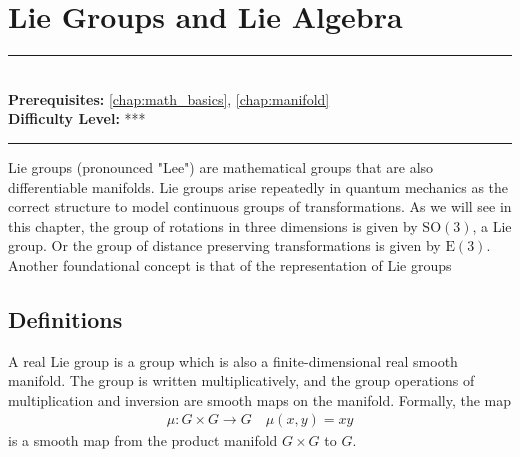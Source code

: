 \documentclass[book.tex]{subfiles}
\begin{document}
\chapter{Lie Groups and Lie Algebra}
\label{chap:lie}
\noindent\rule{11cm}{0.4pt} \\
\textbf{Prerequisites:} \autoref{chap:math_basics}, \autoref{chap:manifold} \\ 
\textbf{Difficulty Level:} *** \\
\noindent\rule{11cm}{0.4pt}
\vspace{5mm}

Lie groups (pronounced "Lee") are mathematical groups that are also differentiable manifolds. Lie groups arise repeatedly in quantum mechanics as the correct structure to model continuous groups of transformations. As we will see in this chapter, the group of rotations in three dimensions is given by $\mathrm{SO}(3)$, a Lie group. Or the group of distance preserving transformations is given by $\mathrm{E}(3)$. Another foundational concept is that of the representation of Lie groups

\section{Definitions}

A real Lie group is a group which is also a finite-dimensional real smooth manifold. The group is written multiplicatively, and the group operations of multiplication and inversion are smooth maps on the manifold. Formally, the map 
\begin{align}
    \mu:G \times G \to G \quad \mu(x, y) = xy
\end{align}
is a smooth map from the product manifold $G \times G$ to $G$. %
\end{document}
